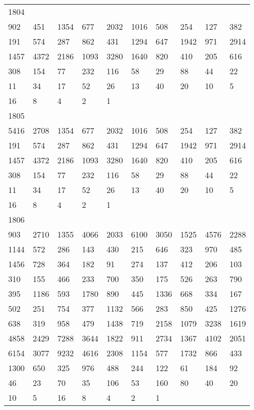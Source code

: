 \begin{longtable}{*{10}{l}}
1804&&&&&&&&&\\
902& 451& 1354& 677& 2032& 1016& 508& 254& 127& 382\\
191& 574& 287& 862& 431& 1294& 647& 1942& 971& 2914\\
1457& 4372& 2186& 1093& 3280& 1640& 820& 410& 205& 616\\
308& 154& 77& 232& 116& 58& 29& 88& 44& 22\\
11& 34& 17& 52& 26& 13& 40& 20& 10& 5\\
16& 8& 4& 2& 1& \\

1805&&&&&&&&&\\
5416& 2708& 1354& 677& 2032& 1016& 508& 254& 127& 382\\
191& 574& 287& 862& 431& 1294& 647& 1942& 971& 2914\\
1457& 4372& 2186& 1093& 3280& 1640& 820& 410& 205& 616\\
308& 154& 77& 232& 116& 58& 29& 88& 44& 22\\
11& 34& 17& 52& 26& 13& 40& 20& 10& 5\\
16& 8& 4& 2& 1& \\

1806&&&&&&&&&\\
903& 2710& 1355& 4066& 2033& 6100& 3050& 1525& 4576& 2288\\
1144& 572& 286& 143& 430& 215& 646& 323& 970& 485\\
1456& 728& 364& 182& 91& 274& 137& 412& 206& 103\\
310& 155& 466& 233& 700& 350& 175& 526& 263& 790\\
395& 1186& 593& 1780& 890& 445& 1336& 668& 334& 167\\
502& 251& 754& 377& 1132& 566& 283& 850& 425& 1276\\
638& 319& 958& 479& 1438& 719& 2158& 1079& 3238& 1619\\
4858& 2429& 7288& 3644& 1822& 911& 2734& 1367& 4102& 2051\\
6154& 3077& 9232& 4616& 2308& 1154& 577& 1732& 866& 433\\
1300& 650& 325& 976& 488& 244& 122& 61& 184& 92\\
46& 23& 70& 35& 106& 53& 160& 80& 40& 20\\
10& 5& 16& 8& 4& 2& 1& \\


\end{longtable}
